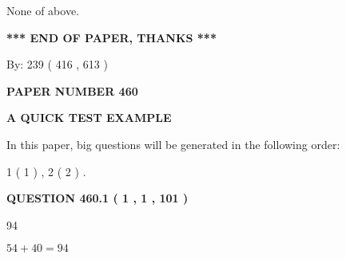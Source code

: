\documentclass[12pt]{article}
\begin{document}
 
 None of above.
 
 
 
 
   
   
 \vspace{0.2in}
 
   
   
   
   
\vspace{1.0in} 
{\textbf{\large{ *** END OF PAPER, THANKS *** }}} 
   
   
\hspace{1.0in} By: 
 239 ( 416 ,  613 )
   
   
   
   
\newpage 
\setcounter{page}{ 
   460001 } 
   
   
   
   
 {\textbf{ \Large{ PAPER NUMBER  460  }}}
   
   
\vspace{0.2in}
   
   
   
   
   
   
 \vspace{0.2in}
{\LARGE {\textbf{ A QUICK TEST EXAMPLE}}}
   
   
   
\vspace{0.2in}
   
In this paper, big questions will be generated in the following order: 
   
   
   1 ( 1 )
 ,
   2 ( 2 )
 .
  
\vspace{0.2in}
  
{\textbf{\Large{QUESTION
460.1 
 ( 1 , 1 , 101 )
}}}
  
  
 
 
\noindent{}

94
 
 
 
 
\noindent{}

$ %
54 +  %
40=   %
94$
 
 
  
\vspace{0.2in}
  
\end{document}
